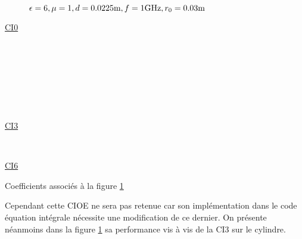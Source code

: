     \begin{figure}[!hbt]
      \centering
      
      \caption[CIOE sur empilement de Hoppe & Rahmat-Samii p.~62]{\(\epsilon = 6, \mu = 1, d=0.0225\text{m}, f=1\text{GHz}, r_0=0.03\text{m}\)}
      \label{fig:imp_fourier:plan:hoppe:62:hoibc:ibc6}
    \end{figure}
    \begin{table}[!hbt]
      \centering
      \begin{coefftable}{\hyperlink{ci0}{CI0}}
        
        \\
        \\
        \\
        \\
        \\
        \\
      \end{coefftable}
      \begin{coefftable}{\hyperlink{ci3}{CI3}}
        
        \\
      \end{coefftable}
      \begin{coefftable}{\hyperlink{ci6}{CI6}}
        
      \end{coefftable}
      \caption{Coefficients associés à la figure \ref{fig:imp_fourier:plan:hoppe:62:hoibc:ibc6}}
      \label{tab:imp_fourier:plan:hoppe:62:hoibc:ibc6}
    \end{table}

    Cependant cette CIOE ne sera pas retenue car son implémentation dans le code équation intégrale nécessite une modification de ce dernier. On présente néanmoins dans la figure \ref{fig:imp_fourier:plan:hoppe:62:hoibc:ibc6} sa performance vis à vis de la CI3 sur le cylindre.